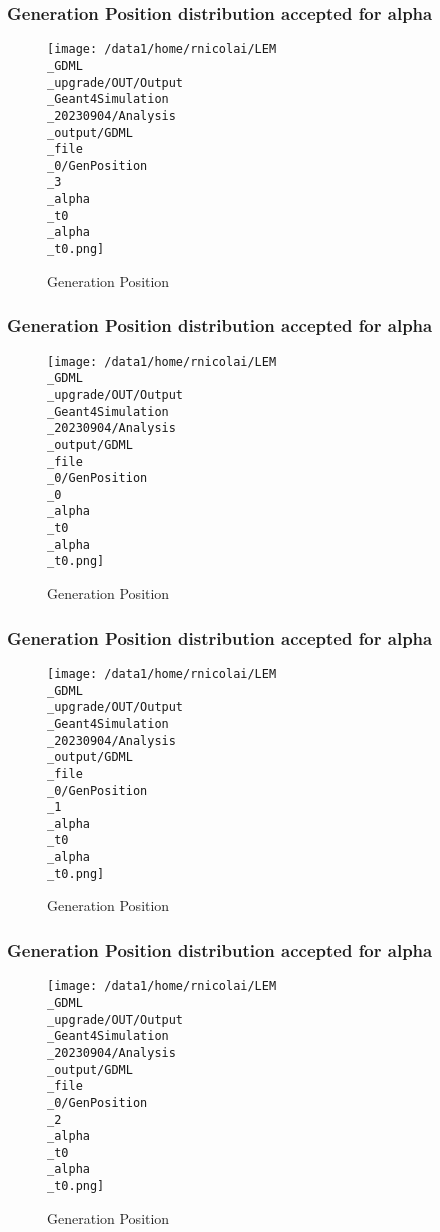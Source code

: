 \documentclass[8pt]{beamer}
\begin{document}
            \begin{frame}
                \frametitle{Generation Position distribution accepted for alpha}
            
        \begin{figure}[h]
            \centering
            \texttt{[image: /data1/home/rnicolai/LEM\\\_GDML\\\_upgrade/OUT/Output\\\_Geant4Simulation\\\_20230904/Analysis\\\_output/GDML\\\_file\\\_0/GenPosition\\\_3\\\_alpha\\\_t0\\\_alpha\\\_t0.png]}
            \caption{Generation Position}
        \end{figure}
        
            \end{frame}
            
            \begin{frame}
                \frametitle{Generation Position distribution accepted for alpha}
            
        \begin{figure}[h]
            \centering
            \texttt{[image: /data1/home/rnicolai/LEM\\\_GDML\\\_upgrade/OUT/Output\\\_Geant4Simulation\\\_20230904/Analysis\\\_output/GDML\\\_file\\\_0/GenPosition\\\_0\\\_alpha\\\_t0\\\_alpha\\\_t0.png]}
            \caption{Generation Position}
        \end{figure}
        
            \end{frame}
            
            \begin{frame}
                \frametitle{Generation Position distribution accepted for alpha}
            
        \begin{figure}[h]
            \centering
            \texttt{[image: /data1/home/rnicolai/LEM\\\_GDML\\\_upgrade/OUT/Output\\\_Geant4Simulation\\\_20230904/Analysis\\\_output/GDML\\\_file\\\_0/GenPosition\\\_1\\\_alpha\\\_t0\\\_alpha\\\_t0.png]}
            \caption{Generation Position}
        \end{figure}
        
            \end{frame}
            
            \begin{frame}
                \frametitle{Generation Position distribution accepted for alpha}
            
        \begin{figure}[h]
            \centering
            \texttt{[image: /data1/home/rnicolai/LEM\\\_GDML\\\_upgrade/OUT/Output\\\_Geant4Simulation\\\_20230904/Analysis\\\_output/GDML\\\_file\\\_0/GenPosition\\\_2\\\_alpha\\\_t0\\\_alpha\\\_t0.png]}
            \caption{Generation Position}
        \end{figure}
        
            \end{frame}
            
\end{document}
